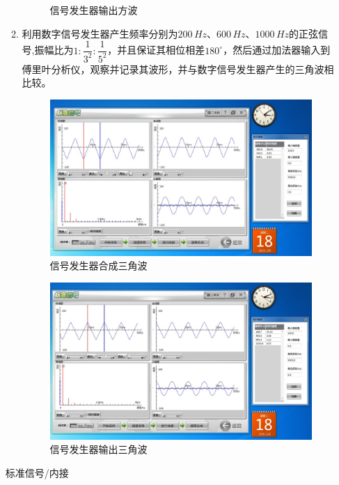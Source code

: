 \documentclass[11pt]{article}
\begin{document}
\begin{enumerate}
\begin{enumerate}
\begin{figure}[H]
            \caption{信号发生器输出方波}
        \end{figure}
        \item 利用数字信号发生器产生频率分别为$200\,Hz$、$600\,Hz$、$1000\,Hz$的正弦信号,振幅比为$1:\dfrac{1}{3^2}:\dfrac{1}{5^2}$，并且保证其相位相差$180^\circ$，然后通过加法器输入到傅里叶分析仪，观察并记录其波形，并与数字信号发生器产生的三角波相比较。
        \begin{figure}[H]
            \centering
            \includegraphics[width=15cm]{Fig/图3 信号发生器合成三角波.JPG}
            \caption{信号发生器合成三角波}
        \end{figure}
        \begin{figure}[H]
            \centering
            \includegraphics[width=15cm]{Fig/图4 信号发生器输出三角波.JPG}
            \caption{信号发生器输出三角波}
        \end{figure}
    \end{enumerate}
    
    \begin{center}
        \Large{标准信号/内接}
    \end{center}
    

\end{enumerate}
\end{document}
